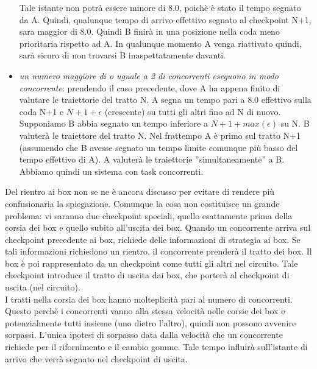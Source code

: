 \begin{itemize}
Tale istante non potr\`{a} essere minore di 8.0, poich\`{e} \`{e} stato il tempo segnato da A. Quindi, qualunque tempo di arrivo effettivo segnato al checkpoint
N+1, sara maggior di 8.0. Quindi B finir\`{a} in una posizione nella coda meno prioritaria rispetto ad A. In qualunque momento A venga riattivato quindi, sar\`{a}
sicuro di non trovarsi B inaspettatamente davanti.
\item \emph{un numero maggiore di o uguale a 2 di concorrenti eseguono in modo concorrente}: prendendo il caso precedente, dove A ha appena finito di valutare le
traiettorie del tratto N. A segna un tempo pari a 8.0 effettivo sulla coda N+1 e $N+1+\epsilon$ (crescente) su tutti gli altri fino ad N di nuovo. Supponiamo
B abbia segnato un tempo inferiore a $N+1+max(\epsilon)$ su N. B valuter\`{a} le traiettore del tratto N. Nel frattempo A \`{e} primo sul tratto N+1 (assumendo
che B avesse segnato un tempo limite comunque pi\`{u} basso del tempo effettivo di A). A valuter\`{a} le traiettorie
''simultaneamente'' a B. Abbiamo quindi un sistema con task concorrenti.
\end{itemize}
Del rientro ai box non se ne \`{e} ancora discusso per evitare di rendere pi\`{u} confusionaria la spiegazione. Comunque la cosa non costituisce
un grande problema: vi saranno due checkpoint speciali, quello esattamente prima della corsia dei box e quello subito all'uscita dei box.
Quando un concorrente arriva sul checkpoint precedente ai box, richiede delle informazioni di strategia ai box. Se tali informazioni
richiedono un rientro, il concorrente prender\`{a} il tratto dei box. Il box \`{e} poi rappresentato da un checkpoint come tutti gli altri nel circuito.
Tale checkpoint introduce il tratto di uscita dai box, che porter\`{a} al checkpoint di uscita (nel circuito).\\
I tratti nella corsia dei box hanno molteplicit\`{a} pari al numero di concorrenti. Questo perch\`{e} i concorrenti vanno alla stessa
velocit\`{a} nelle corsie dei box e potenzialmente tutti insieme (uno dietro l'altro), quindi non possono avvenire sorpassi. L'unica ipotesi di
sorpasso data dalla velocit\`{a} che un concorrente richiede per il rifornimento e il cambio gomme. Tale tempo influir\`{a} sull'istante di arrivo
che verr\`{a} segnato nel checkpoint di uscita.
